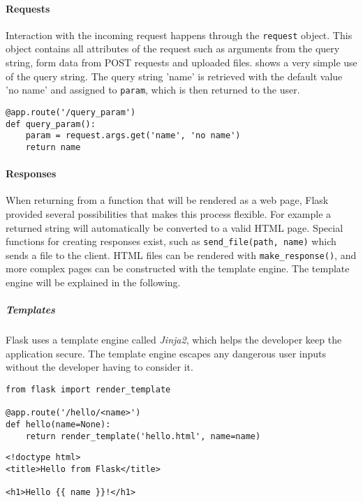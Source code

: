 \paragraph{Requests}
Interaction with the incoming request happens through the \texttt{request} object.
This object contains all attributes of the request such as arguments from the query string, form data from POST requests and uploaded files.
 shows a very simple use of the query string.
The query string 'name' is retrieved with the default value 'no name' and assigned to \texttt{param}, which is then returned to the user.

\begin{lstlisting}[style=python, caption={Simple use of the query string}, label={query_string}]
@app.route('/query_param')
def query_param():
    param = request.args.get('name', 'no name')
    return name
\end{lstlisting}

\paragraph{Responses}
When returning from a function that will be rendered as a web page, Flask provided several possibilities that makes this process flexible.
For example a returned string will automatically be converted to a valid HTML page.
Special functions for creating responses exist, such as \texttt{send\_file(path, name)} which sends a file to the client.
HTML files can be rendered with \texttt{make\_response()}, and more complex pages can be constructed with the template engine.
The template engine will be explained in the following.

\subparagraph{Templates}
Flask uses a template engine called \emph{Jinja2}, which helps the developer keep the application secure.
The template engine escapes any dangerous user inputs without the developer having to consider it.

\begin{lstlisting}[style=python, caption={Rendering a template that displays the name parameter}, label={template}]
from flask import render_template
  
@app.route('/hello/<name>')
def hello(name=None):
    return render_template('hello.html', name=name)
\end{lstlisting}

\begin{lstlisting}[style=python, caption={The Jinja2 template used by the hello example}, label={template_html}]
<!doctype html>
<title>Hello from Flask</title>

<h1>Hello {{ name }}!</h1>
\end{lstlisting}


